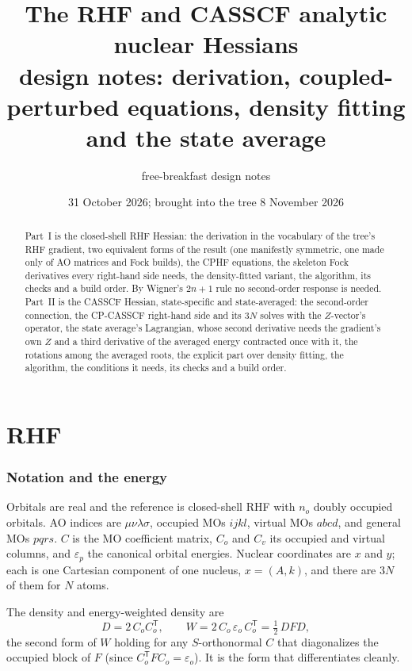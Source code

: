 \documentclass[11pt]{article}
\title{The RHF and CASSCF analytic nuclear Hessians\\
\large design notes: derivation, coupled-perturbed equations, density
fitting and the state average}
\author{free-breakfast design notes}
\date{31 October 2026; brought into the tree 8 November 2026}
\newcommand{\eps}{\varepsilon}
\begin{document}
\sloppy
\maketitle

\begin{abstract}
Part~I is the closed-shell RHF Hessian: the derivation in the vocabulary of
the tree's RHF gradient, two equivalent forms of the result (one manifestly
symmetric, one made only of AO matrices and Fock builds), the CPHF
equations, the skeleton Fock derivatives every right-hand side needs, the
density-fitted variant, the algorithm, its checks and a build order. By
Wigner's $2n+1$ rule no second-order response is needed. Part~II is the
CASSCF Hessian, state-specific and state-averaged: the second-order
connection, the CP-CASSCF right-hand side and its $3N$ solves with the
$Z$-vector's operator, the state average's Lagrangian, whose second
derivative needs the gradient's own $Z$ and a third derivative of the
averaged energy contracted once with it, the rotations among the averaged
roots, the explicit part over density fitting, the algorithm, the
conditions it needs, its checks and a build order.
\end{abstract}

\tableofcontents

\part{RHF}

\section{Notation and the energy}
\label{sec:rhf-notation}

Orbitals are real and the reference is closed-shell RHF with $n_o$ doubly
occupied orbitals. AO indices are $\mu\nu\lambda\sigma$, occupied MOs
$ijkl$, virtual MOs $abcd$, and general MOs $pqrs$. $C$ is the MO
coefficient matrix, $C_o$ and $C_v$ its occupied and virtual columns, and
$\eps_p$ the canonical orbital energies. Nuclear coordinates are $x$ and
$y$; each is one Cartesian component of one nucleus, $x = (A, k)$, and there
are $3N$ of them for $N$ atoms.

The density and energy-weighted density are
\begin{equation}
  D = 2\,C_o C_o^{\mathsf T}, \qquad
  W = 2\,C_o\,\eps_o\,C_o^{\mathsf T} = \tfrac12\,D F D,
  \label{eq:dw}
\end{equation}
the second form of $W$ holding for any $S$-orthonormal $C$ that
diagonalizes the occupied block of $F$ (since $C_o^{\mathsf T} F C_o =
\eps_o$). It is the form that differentiates cleanly.
\end{document}

